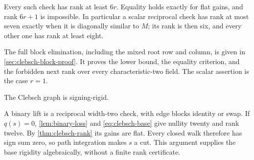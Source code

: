\begin{theorem}\label{thm:clebsch-rank}
\notformalized
Every such check has rank at least $6r$. Equality holds exactly for
flat gains, and rank $6r+1$ is impossible. In particular a scalar
reciprocal check has rank at most seven exactly when it is diagonally
similar to $M$; its rank is then six, and every other one has rank
at least eight.
\end{theorem}
\begin{informalproof}
The full block elimination, including the mixed root row and column,
is given in \cref{sec:clebsch-block-proof}. It proves the lower bound,
the equality criterion, and the forbidden next rank over every
characteristic-two field. The scalar assertion is the case $r=1$.
\end{informalproof}

\begin{corollary}\label{cor:clebsch-rigid}
\notformalized
The Clebsch graph is signing-rigid.
\end{corollary}
\begin{informalproof}
A binary lift is a reciprocal width-two check, with edge blocks
identity or swap. If $q(s)=0$, \cref{lem:binary-loss} and
\eqref{eq:clebsch-base} give nullity twenty and rank twelve.
By \cref{thm:clebsch-rank} its gains are flat. Every closed walk
therefore has sign sum zero, so path integration makes $s$ a cut.
This argument supplies the base rigidity algebraically, without a
finite rank certificate.
\end{informalproof}

